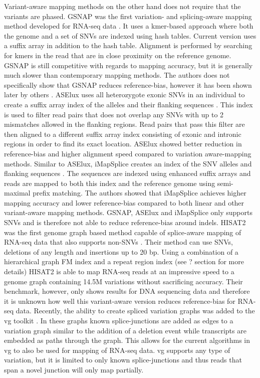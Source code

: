 Variant-aware mapping methods on the other hand does not require that the variants are phased.
GSNAP was the first variation- and splicing-aware mapping method developed for RNA-seq data \cite{Wu2010-hv}.
It uses a kmer-based approach where both the genome and a set of SNVs are indexed using hash tables. %
Current version uses a suffix array in addition to the hash table.
Alignment is performed by searching for kmers in the read that are in close proximity on the reference genome. %
GSNAP is still competitive with regards to mapping accuracy, but it is generally much slower than contemporary mapping methods.
The authors does not specifically show that GSNAP reduces reference-bias, however it has been shown later by others \cite{Castel2015-ef}.
ASElux uses all heterozygote exonic SNVs in an individual to create a suffix array index of the alleles and their flanking sequences \cite{Miao2018-ps}. 
This index is used to filter read pairs that does not overlap any SNVs with up to 2 mismatches allowed in the flanking regions. 
Read pairs that pass this filter are then aligned to a different suffix array index consisting of exonic and intronic regions in order to find its exact location. 
ASElux showed better reduction in reference-bias and higher alignment speed compared to variation aware-mapping methods.
Similar to ASElux, iMapSplice creates an index of the SNV alleles and flanking sequences \cite{Liu_2018}.
The sequences are indexed using enhanced suffix arrays and reads are mapped to both this index and the reference genome using semi-maximal prefix matching.
The authors showed that iMapSplice achieves higher mapping accuracy and lower reference-bias compared to both linear and other variant-aware mapping methods.
GSNAP, ASElux and iMapSplice only supports SNVs and is therefore not able to reduce reference-bias around indels.
HISAT2 was the first genome graph based method capable of splice-aware mapping of RNA-seq data that also supports non-SNVs \cite{Kim_2019}. 
Their method can use SNVs, deletions of any length and insertions up to 20 bp.
Using a combination of a hierarchical graph FM index and a repeat region index (see ? section for more details) HISAT2 is able to map RNA-seq reads at an impressive speed to a genome graph containing 14.5M variations without sacrificing accuracy. 
Their benchmark, however, only shows results for DNA sequencing data and therefore it is unknown how well this variant-aware version reduces reference-bias for RNA-seq data.
Recently, the ability to create spliced variation graphs was added to the vg toolkit \cite{Garrison_2018}. 
In these graphs known splice-junctions are added as edges to a variation graph similar to the addition of a deletion event while transcripts are embedded as paths through the graph. 
This allows for the current algorithms in vg to also be used for mapping of RNA-seq data. 
vg supports any type of variation, but it is limited to only known splice-junctions and thus reads that span a novel junction will only map partially. \\

